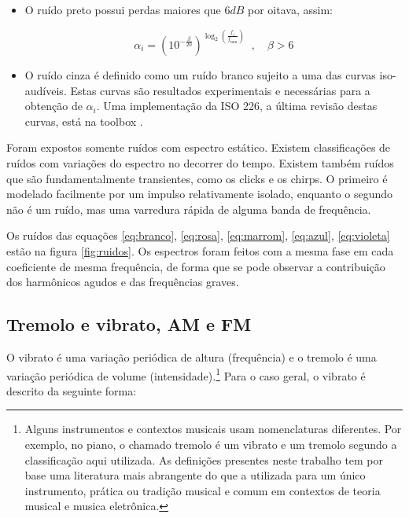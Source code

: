 \begin{itemize}
\item O ruído preto possui perdas maiores que $6dB$ por oitava, assim:

\begin{equation}\label{eq:preto}
\alpha_i=(10^{-\frac{\beta}{20}})^{\log _2 \left( \frac{f_i}{f_{\text{min}}} \right )}\;\;, \quad \beta > 6
\end{equation}



\item O ruído cinza é definido como
um ruído branco sujeito a uma das curvas iso-audíveis. Estas curvas são resultados
experimentais e necessárias para a obtenção de $\alpha_i$. Uma implementação da ISO 226, a última revisão destas curvas, está na toolbox \massa.\cite{MASSA}

\end{itemize}

Foram expostos somente ruídos com espectro estático. Existem classificações
de ruídos com variações do espectro no decorrer do tempo. Existem também ruídos que
são fundamentalmente transientes, como os clicks e os chirps. O primeiro é modelado
facilmente por um impulso relativamente isolado, enquanto o segundo não é um ruído, mas uma varredura rápida de 
alguma banda de frequência.\cite{Cook}

Os ruídos das equações \ref{eq:branco}, \ref{eq:rosa}, \ref{eq:marrom},
\ref{eq:azul}, \ref{eq:violeta} estão na figura \ref{fig:ruidos}. Os espectros foram feitos com a mesma fase em cada coeficiente de mesma frequência, de forma que
se pode observar a contribuição dos harmônicos agudos e
das frequências graves.


\subsection{Tremolo e vibrato, AM e FM}\label{subsec:tvaf}

O vibrato é uma variação periódica de altura (frequência) e 
o tremolo é uma variação periódica de volume (intensidade).\footnote{Alguns instrumentos e contextos musicais usam nomenclaturas diferentes. Por exemplo, no piano, o chamado tremolo é um vibrato e um tremolo segundo a classificação aqui utilizada. As definições presentes neste trabalho tem por base uma literatura mais abrangente do que a utilizada para um único instrumento, prática ou tradição musical e comum em contextos de teoria musical e musica eletrônica.\cite{Lacerda,Harmonia}}
Para o caso geral, o vibrato é descrito da seguinte forma:


